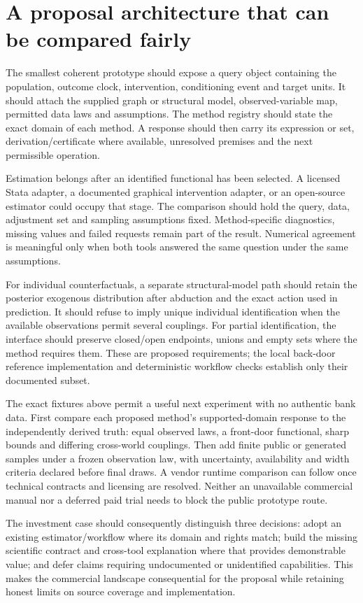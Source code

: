 \section{A proposal architecture that can be compared fairly}

The smallest coherent prototype should expose a query object containing the
population, outcome clock, intervention, conditioning event and target units.
It should attach the supplied graph or structural model, observed-variable
map, permitted data laws and assumptions. The method registry should state
the exact domain of each method. A response should then carry its expression
or set, derivation/certificate where available, unresolved premises and the
next permissible operation.

Estimation belongs after an identified functional has been selected. A
licensed Stata adapter, a documented graphical intervention adapter, or an
open-source estimator could occupy that stage. The comparison should hold the
query, data, adjustment set and sampling assumptions fixed. Method-specific
diagnostics, missing values and failed requests remain part of the result.
Numerical agreement is meaningful only when both tools answered the same
question under the same assumptions.

For individual counterfactuals, a separate structural-model path should retain
the posterior exogenous distribution after abduction and the exact action used
in prediction. It should refuse to imply unique individual identification when
the available observations permit several couplings. For partial identification,
the interface should preserve closed/open endpoints, unions and empty sets
where the method requires them. These are proposed requirements; the local
back-door reference implementation and deterministic workflow checks establish
only their documented subset.

The exact fixtures above permit a useful next experiment with no authentic
bank data. First compare each proposed method's supported-domain response to
the independently derived truth: equal observed laws, a front-door functional,
sharp bounds and differing cross-world couplings. Then add finite public or
generated samples under a frozen observation law, with uncertainty, availability
and width criteria declared before final draws. A vendor runtime comparison
can follow once technical contracts and licensing are resolved. Neither an
unavailable commercial manual nor a deferred paid trial needs to block the
public prototype route.

The investment case should consequently distinguish three decisions: adopt
an existing estimator/workflow where its domain and rights match; build the
missing scientific contract and cross-tool explanation where that provides
demonstrable value; and defer claims requiring undocumented or unidentified
capabilities. This makes the commercial landscape consequential for the
proposal while retaining honest limits on source coverage and implementation.
\label{exec13:commercial-identification-end}
